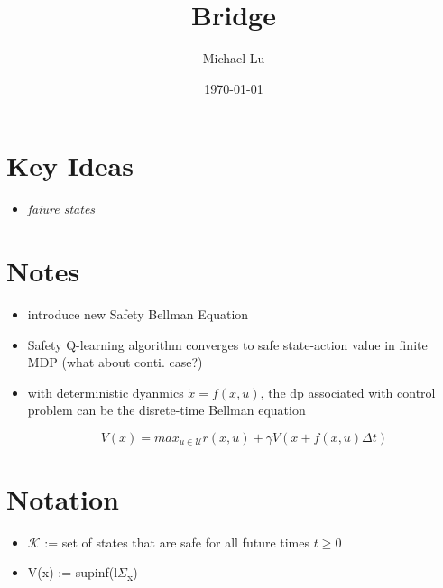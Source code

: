 \documentclass[11pt]{article}
\author{Michael Lu}
\date{\today}
\title{Bridge}
\begin{document}
\maketitle
\tableofcontents


\section{Key Ideas}
\label{sec:org22324d3}
\begin{itemize}
\item \emph{faiure states}
\end{itemize}
\section{Notes}
\label{sec:org9baeac8}
\begin{itemize}
\item introduce new Safety Bellman Equation
\item Safety Q-learning algorithm converges to safe state-action value in finite MDP
(what about conti. case?)
\item with deterministic dyanmics \(\dot{x} = f(x, u)\), the dp associated with control problem can be the disrete-time Bellman equation

$$V(x) = max_{u \in \mathcal{U}}r(x, u) + \gamma V(x + f(x,u) \Delta t)$$
\end{itemize}
\section{Notation}
\label{sec:org8919529}
\begin{itemize}
\item \(\mathcal{K}\) := set of states that are safe for all future times \(t \geq 0\)
\item V(x) := supinf(l\(\Sigma\)\textsubscript{x})
\end{itemize}
\end{document}
